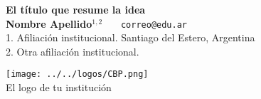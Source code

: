 \documentclass[a0,portrait]{a0poster} %
\begin{document}
\centering \fontsize{90}{90} \textbf{El título que resume la idea} \\[0.5cm]  %
\LARGE \textbf{Nombre Apellido}$^{1,2}$  \ \ \  \texttt{correo@edu.ar} \\
\large 1. Afiliación institucional. Santiago del Estero, Argentina \\
\large 2. Otra afiliación institucional.\\


\vspace{1cm}

\texttt{[image: ../../logos/CBP.png]} \\
\fontsize{55}{55}\selectfont El logo de tu institución \\[0.3cm]



\end{document}

